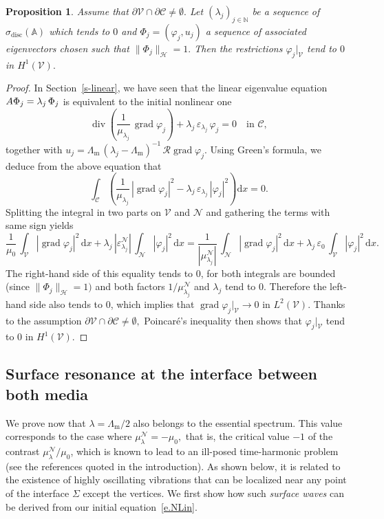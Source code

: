 \documentclass[10pt]{amsart}
\newtheorem{prop}[cdrthm]{Proposition}
\theoremstyle{definition}
\DeclareMathOperator{\Div}{div}
\DeclareMathOperator{\grad}{grad}
\DeclareMathOperator{\disc}{disc}
\newcommand{\epsl}{\varepsilon}
\newcommand{\calC}{\mathcal{C}}
\newcommand{\calH}{\mathcal{H}}
\newcommand{\calN}{\mathcal{N}}
\newcommand{\calR}{\mathcal{R}}
\newcommand{\calV}{\mathcal{V}}
\newcommand{\bbA}{\mathbb{A}}
\newcommand{\bbN}{\mathbb{N}}
\newcommand{\rmd}{{\mathrm{d}}}
\newcommand{\Lm}{{\Lambda_{\mathrm{m}}}}
\begin{document}
\begin{prop}\label{prop3.4}
Assume that $\partial\calV \cap \partial\calC \neq \emptyset.$ Let $(\lambda_j)_{j \in \bbN}$ be a sequence of $\sigma_{\disc}(\bbA)$ which tends to $0$ and $\Phi_j = (\varphi_j,u_j)$ a sequence of associated eigenvectors chosen such that $\| \Phi_j \|_\calH = 1.$ Then the restrictions $\varphi_j|_\calV$ tend to $0$ in $H^1(\calV).$
\end{prop}

\begin{proof}
In Section~\ref{s-linear}, we have seen that the linear eigenvalue equation $A \Phi_j\linebreak= \lambda_j\,\Phi_j$ is equivalent to the initial nonlinear one
\[
\Div \left(\frac{1}{\mu_{\lambda_j}}\, \grad\varphi_j \right) + \lambda_j\,\epsl_{\lambda_j}\,\varphi_j = 0
\quad\text{in }\calC,
\]
together with $u_j = \Lm \, (\lambda_j-\Lm)^{-1} \, \calR \grad\varphi_j.$ Using Green's formula, we deduce from the above equation that
\[
\int_\calC \left(\frac{1}{\mu_{\lambda_j}}\, |\grad\varphi_j|^2 - \lambda_j\,\epsl_{\lambda_j}\,|\varphi_j|^2 \right) \rmd x = 0.
\]
Splitting the integral in two parts on $\calV$ and $\calN$ and gathering the terms with same sign yields
\[
\frac{1}{\mu_0}\,\int_\calV |\grad\varphi_j|^2 \,\rmd x +
\lambda_j\,|\epsl^\calN_{\lambda_j}| \,\int_\calN |\varphi_j|^2 \,\rmd x = \frac{1}{|\mu^\calN_{\lambda_j}|}\,\int_\calN |\grad\varphi_j|^2 \,\rmd x +
\lambda_j\,\epsl_0 \,\int_\calV |\varphi_j|^2 \,\rmd x.
\]
The right-hand side of this equality tends to 0, for both integrals are bounded (since $\| \Phi_j \|_\calH = 1)$ and both factors $1/\mu^\calN_{\lambda_j}$ and $\lambda_j$ tend to 0. Therefore the left-hand side also tends to 0, which implies that $\grad\varphi_j|_\calV \to 0$ in $L^2(\calV).$ Thanks to the assumption $\partial\calV \cap \partial\calC \neq \emptyset,$ Poincaré's inequality then shows that $\varphi_j|_\calV$ tend to $0$ in $H^1(\calV).$
\end{proof}

\subsection{Surface resonance at the interface between both media}\label{s-surface-reson}
We prove now that $\lambda = \Lm/2$ also belongs to the essential spectrum. This value corresponds to the case where $\mu_\lambda^\calN = -\mu_0,$ that is, the critical value $-1$ of the contrast $\mu_\lambda^\calN/\mu_0$, which is known to lead to an ill-posed time-harmonic problem (see the references quoted in the introduction). As shown below, it is related to the existence of highly oscillating vibrations that can be localized near any point of the interface $\Sigma$ except the vertices. We first show how such \emph{surface waves} can be derived from our initial equation~\eqref{e.NLin}.
\end{document}
